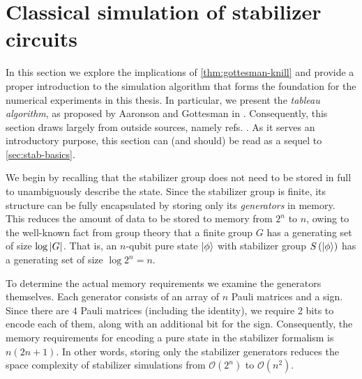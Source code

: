\section{Classical simulation of stabilizer circuits}\label{sec:sim-stab}
In this section we explore the implications of \cref{thm:gottesman-knill} and
provide a proper introduction to the simulation algorithm that forms the
foundation for the numerical experiments in this thesis.  In particular, we
present the \emph{tableau algorithm}, as proposed by Aaronson and Gottesman in
\cite{aaronsonImprovedSimulationStabilizer2004}.  Consequently, this section
draws largely from outside sources, namely refs.
\cite{aaronsonImprovedSimulationStabilizer2004, arabLectureNotesQuantum2024,
gottesmanStabilizerCodesQuantum1997,
gottesmanHeisenbergRepresentationQuantum1998}. As it serves an introductory
purpose, this section can (and should) be read as a sequel to
\cref{sec:stab-basics}.

We begin by recalling that the stabilizer group does not need to be stored in
full to unambiguously describe the state. Since the stabilizer group is finite,
its structure can be fully encapsulated by storing only its \emph{generators}
in memory. This reduces the amount of data to be stored to memory from $2^n$
to $n$, owing to the well-known fact from group theory that a finite group $G$
has a generating set of size $\log \abs{G}$. That is, an $n$-qubit pure state
$\ket{\phi}$ with stabilizer group $S\left(\ket{\phi}\right)$ has a generating
set of size $\log 2^n = n$.

To determine the actual memory requirements we examine the generators
themselves.  Each generator consists of an array of $n$ Pauli matrices and a
sign. Since there are $4$ Pauli matrices (including the identity), we require 2
bits to encode each of them, along with an additional bit for the sign.
Consequently, the memory requirements for encoding a pure state in the
stabilizer formalism is $n(2n+1)$. In other words, storing only the stabilizer
generators reduces the space complexity of stabilizer simulations from
$\mathcal{O}\left( 2^n \right)$ to $\mathcal{O}\left( n^2 \right)$.

